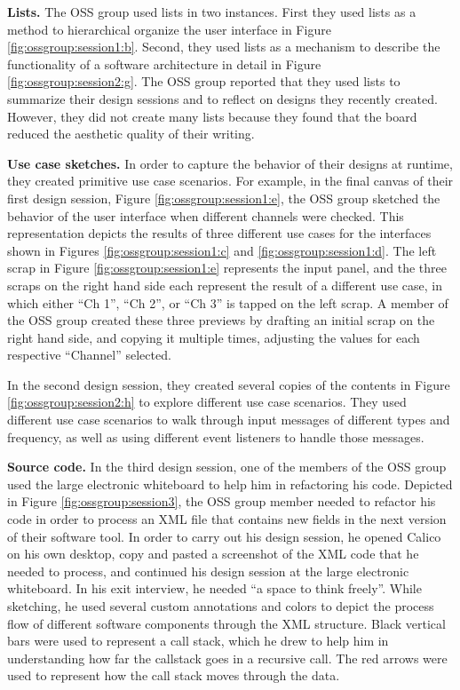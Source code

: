 \documentclass[12pt,fleqn]{ucithesis}
\begin{document}
\textbf{Lists. } The OSS group used lists in two instances. First they used lists as a method to hierarchical organize the user interface in Figure \ref{fig:ossgroup:session1:b}. Second, they used lists as a mechanism to describe the functionality of a software architecture in detail in Figure \ref{fig:ossgroup:session2:g}. The OSS group reported that they used lists to summarize their design sessions and to reflect on designs they recently created. However, they did not create many lists because they found that the board reduced the aesthetic quality of their writing.

\textbf{Use case sketches. } In order to capture the behavior of their designs at runtime, they created primitive use case scenarios. For example, in the final canvas of their first design session, Figure \ref{fig:ossgroup:session1:e}, the OSS group sketched the behavior of the user interface when different channels were checked. This representation depicts the results of three different use cases for the interfaces shown in Figures \ref{fig:ossgroup:session1:c} and \ref{fig:ossgroup:session1:d}. The left scrap in Figure \ref{fig:ossgroup:session1:e} represents the input panel, and the three scraps on the right hand side each represent the result of a different use case, in which either ``Ch 1'', ``Ch 2'', or ``Ch 3'' is tapped on the left scrap. A member of the OSS group created these three previews by drafting an initial scrap on the right hand side, and copying it multiple times, adjusting the values for each respective ``Channel'' selected. 

In the second design session, they created several copies of the contents in Figure \ref{fig:ossgroup:session2:h} to explore different use case scenarios. They used different use case scenarios to walk through input messages of different types and frequency, as well as using different event listeners to handle those messages.

\textbf{Source code. } In the third design session, one of the members of the OSS group used the large electronic whiteboard to help him in refactoring his code. Depicted in Figure \ref{fig:ossgroup:session3}, the OSS group member needed to refactor his code in order to process an XML file that contains new fields in the next version of their software tool. In order to carry out his design session, he opened Calico on his own desktop, copy and pasted a screenshot of the XML code that he needed to process, and continued his design session at the large electronic whiteboard. In his exit interview, he needed ``a space to think freely''. While sketching, he used several custom annotations and colors to depict the process flow of different software components through the XML structure. Black vertical bars were used to represent a call stack, which he drew to help him in understanding how far the callstack goes in a recursive call. The red arrows were used to represent how the call stack moves through the data.
\end{document}
